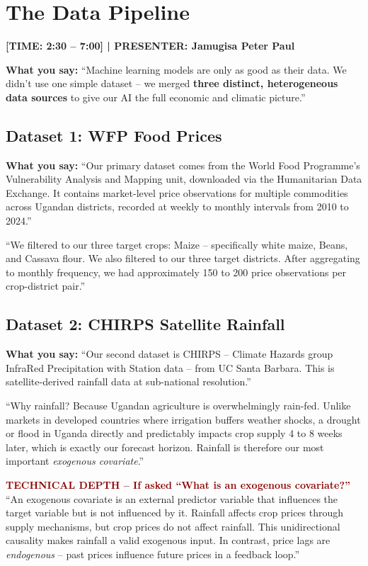 \documentclass[11pt,a4paper]{article}
\begin{document}
\section{The Data Pipeline}
\textcolor{timecolor}{\textbf{[TIME: 2:30 -- 7:00] | PRESENTER: Jamugisa Peter Paul}}

\textbf{What you say:}
``Machine learning models are only as good as their data. We didn't use one simple dataset -- we merged \textbf{three distinct, heterogeneous data sources} to give our AI the full economic and climatic picture.''

\subsection{Dataset 1: WFP Food Prices}
\textbf{What you say:}
``Our primary dataset comes from the World Food Programme's Vulnerability Analysis and Mapping unit, downloaded via the Humanitarian Data Exchange. It contains market-level price observations for multiple commodities across Ugandan districts, recorded at weekly to monthly intervals from 2010 to 2024.''

``We filtered to our three target crops: Maize -- specifically white maize, Beans, and Cassava flour. We also filtered to our three target districts. After aggregating to monthly frequency, we had approximately 150 to 200 price observations per crop-district pair.''

\subsection{Dataset 2: CHIRPS Satellite Rainfall}
\textbf{What you say:}
``Our second dataset is CHIRPS -- Climate Hazards group InfraRed Precipitation with Station data -- from UC Santa Barbara. This is satellite-derived rainfall data at sub-national resolution.''

``Why rainfall? Because Ugandan agriculture is overwhelmingly rain-fed. Unlike markets in developed countries where irrigation buffers weather shocks, a drought or flood in Uganda directly and predictably impacts crop supply 4 to 8 weeks later, which is exactly our forecast horizon. Rainfall is therefore our most important \textit{exogenous covariate}.''

\begin{mdframed}[backgroundcolor=red!5, linecolor=darkred]
\textcolor{darkred}{\textbf{TECHNICAL DEPTH -- If asked ``What is an exogenous covariate?''}}\\
``An exogenous covariate is an external predictor variable that influences the target variable but is not influenced by it. Rainfall affects crop prices through supply mechanisms, but crop prices do not affect rainfall. This unidirectional causality makes rainfall a valid exogenous input. In contrast, price lags are \textit{endogenous} -- past prices influence future prices in a feedback loop.''
\end{mdframed}
\end{document}
